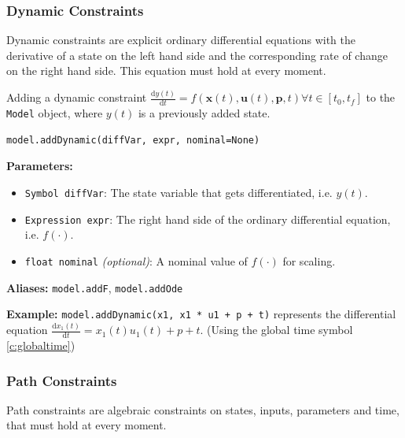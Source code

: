\documentclass[12pt]{article}
\newcommand{\dd}{\mathrm{d}}
\renewcommand{\v}{\bm}
\begin{document}
	\subsubsection{Dynamic Constraints}
	
	Dynamic constraints are explicit ordinary differential equations with the derivative of a state on the left hand side and the corresponding rate of change on the right hand side. This equation must hold at every moment.
	
	\begin{mdframed}[backgroundcolor=gray!10, roundcorner=10pt, linewidth=1pt]
		
		Adding a dynamic constraint $\frac{\dd y(t)}{\dd t} = f(\v{x}(t), \v{u}(t), \v{p}, t) \forall t \in [t_0, t_f]$ to the \texttt{Model} object, where $y(t)$ is a previously added state.
		
		\begin{lstlisting}
model.addDynamic(diffVar, expr, nominal=None)
		\end{lstlisting}
		\label{addDynamic}
		\textbf{Parameters:}
		\begin{itemize}
			\item \texttt{Symbol diffVar}: The state variable that gets differentiated, i.e. $y(t)$.
			\item \texttt{Expression expr}: The right hand side of the ordinary differential equation, i.e. $f(\cdot)$.
			\item \texttt{float nominal} \emph{(optional)}: A nominal value of $f(\cdot)$ for scaling.
		\end{itemize}

		\textbf{Aliases:}  \texttt{model.addF}, \texttt{model.addOde}
		
		\textbf{Example:} \texttt{model.addDynamic(x1, x1 * u1 + p + t)} represents the differential equation
		$\frac{\dd x_1(t)}{\dd t} = x_1(t) u_1(t) + p + t$. (Using the global time symbol \ref{c:globaltime})
	\end{mdframed}
	
	\subsubsection{Path Constraints}
	
	Path constraints are algebraic constraints on states, inputs, parameters and time, that must hold at every moment. 
	
\end{document}
